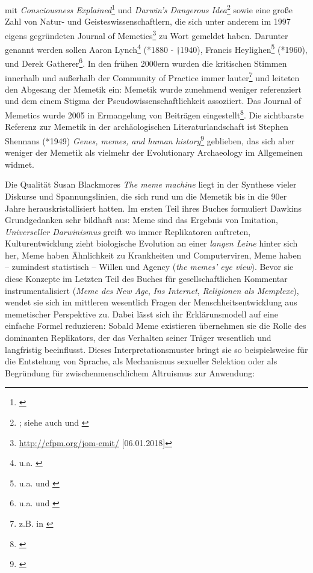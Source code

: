 \documentclass[openany,twoside,twocolumn]{book}
\let\rmarkdownfootnote\footnote%
\def\footnote{\protect\rmarkdownfootnote}
\begin{document}
mit \emph{Consciousness Explained}\footnote{\textcite{dennett_consciousness_1991}}
und \emph{Darwin's Dangerous Idea}\footnote{\textcite{dennett_darwins_1995};
  siehe auch \textcite{dennett_brainstorms_1978} und
  \textcite{dennett_elbow_1984}} sowie eine große Zahl von Natur- und
Geisteswissenschaftlern, die sich unter anderem im 1997 eigens
gegründeten Journal of Memetics\footnote{\url{http://cfpm.org/jom-emit/}
  {[}06.01.2018{]}} zu Wort gemeldet haben. Darunter genannt werden
sollen Aaron Lynch\footnote{u.a. \textcite{lynch_thought_1996}} (*1880 -
†1940), Francis Heylighen\footnote{u.a.
  \textcite{heylighen_evolution_1996} und
  \textcite{heylighen_selfish_1992}} (*1960), und Derek
Gatherer\footnote{u.a. \textcite{gatherer_identifying_2002} und
  \textcite{gatherer_spread_2002}}. In den frühen 2000ern wurden die
kritischen Stimmen innerhalb und außerhalb der Community of Practice
immer lauter\footnote{z.B. in \textcite{aunger_darwinizing_2000}} und
leiteten den Abgesang der Memetik ein: Memetik wurde zunehmend weniger
referenziert und dem einem Stigma der Pseudowissenschaftlichkeit
assoziiert. Das Journal of Memetics wurde 2005 in Ermangelung von
Beiträgen eingestellt\footnote{\textcite{vada_what_2015}}. Die
sichtbarste Referenz zur Memetik in der archäologischen
Literaturlandschaft ist Stephen Shennans (*1949) \emph{Genes, memes, and
human history}\footnote{\textcite{shennan_genes_2002}} geblieben, das
sich aber weniger der Memetik als vielmehr der Evolutionary Archaeology
im Allgemeinen widmet.

Die Qualität Susan Blackmores \emph{The meme machine} liegt in der
Synthese vieler Diskurse und Spannungslinien, die sich rund um die
Memetik bis in die 90er Jahre herauskristallisiert hatten. Im ersten
Teil ihres Buches formuliert Dawkins Grundgedanken sehr bildhaft aus:
Meme sind das Ergebnis von Imitation, \emph{Universeller Darwinismus}
greift wo immer Replikatoren auftreten, Kulturentwicklung zieht
biologische Evolution an einer \emph{langen Leine} hinter sich her, Meme
haben Ähnlichkeit zu Krankheiten und Computerviren, Meme haben --
zumindest statistisch -- Willen und Agency (\emph{the memes' eye view}).
Bevor sie diese Konzepte im Letzten Teil des Buches für
gesellschaftlichen Kommentar instrumentalisiert (\emph{Meme des New
Age}, \emph{Ins Internet}, \emph{Religionen als Memplexe}), wendet sie
sich im mittleren wesentlich Fragen der Menschheitsentwicklung aus
memetischer Perspektive zu. Dabei lässt sich ihr Erklärunsmodell auf
eine einfache Formel reduzieren: Sobald Meme existieren übernehmen sie
die Rolle des dominanten Replikators, der das Verhalten seiner Träger
wesentlich und langfristig beeinflusst. Dieses Interpretationsmuster
bringt sie so beispielsweise für die Entstehung von Sprache, als
Mechanismus sexueller Selektion oder als Begründung für
zwischenmenschlichem Altruismus zur Anwendung:
\end{document}
